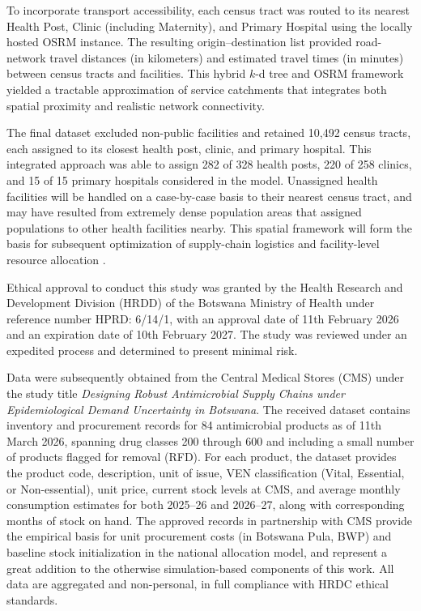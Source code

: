 \documentclass{article}
\begin{document}
To incorporate transport accessibility, each census tract was routed to its nearest Health Post, Clinic (including Maternity), and Primary Hospital using the locally hosted OSRM instance. The resulting origin–destination list provided road-network travel distances (in kilometers) and estimated travel times (in minutes) between census tracts and facilities. This hybrid $k$-d tree and OSRM framework yielded a tractable approximation of service catchments that integrates both spatial proximity and realistic network connectivity.

The final dataset excluded non-public facilities and retained 10,492 census tracts, each assigned to its closest health post, clinic, and primary hospital. This integrated approach was able to assign 282 of 328 health posts, 220 of 258 clinics, and 15 of 15 primary hospitals considered in the model. Unassigned health facilities will be handled on a case-by-case basis to their nearest census tract, and may have resulted from extremely dense population areas that assigned populations to other health facilities nearby. This spatial framework will form the basis for subsequent optimization of supply-chain logistics and facility-level resource allocation \cite{statsbotswana2022}.

Ethical approval to conduct this study was granted by the Health Research and Development Division (HRDD) of the Botswana Ministry of Health under reference number HPRD: 6/14/1, with an approval date of 11th February 2026 and an expiration date of 10th February 2027. The study was reviewed under an expedited process and determined to present minimal risk.

Data were subsequently obtained from the Central Medical Stores (CMS) under the study title \textit{Designing Robust Antimicrobial Supply Chains under Epidemiological Demand Uncertainty in Botswana}. The received dataset contains inventory and procurement records for 84 antimicrobial products 
as of 11th March 2026, spanning drug classes 200 through 600 and including a small number of products flagged for removal (RFD). For each product, the dataset provides the product code, description, unit of issue, VEN classification (Vital, Essential, or Non-essential), unit price, current stock levels at CMS, and average monthly consumption estimates for both 2025--26 and 2026--27, along with corresponding months of stock on hand. The approved records in partnership with CMS provide the empirical basis for unit procurement costs (in Botswana Pula, BWP) and baseline stock initialization in the national allocation model, and represent a great addition to the otherwise simulation-based components of this work. All data are aggregated and non-personal, in full compliance with HRDC ethical standards.
\end{document}
